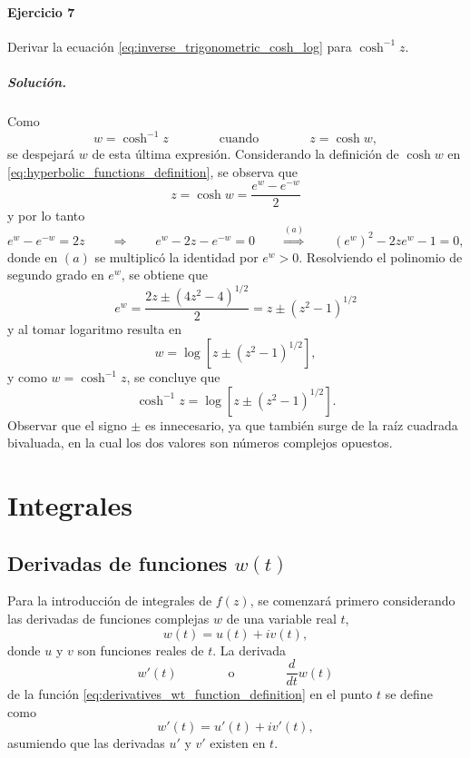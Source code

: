 \documentclass[a4paper]{report}
\begin{document}
\subsubsection{Ejercicio 7}

Derivar la ecuación \ref{eq:inverse_trigonometric_cosh_log} para \(\cosh^{-1}z\).

\paragraph{Solución.} Como
\[
 w=\cosh^{-1}z
 \qquad\qquad\textrm{cuando}\qquad\qquad
 z=\cosh w,
\]
se despejará \(w\) de esta última expresión. Considerando la definición de \(\cosh w\) en  \ref{eq:hyperbolic_functions_definition}, se observa que 
\[
 z=\cosh w=\dfrac{e^w-e^{-w}}{2}
\]
y por lo tanto
\[
 e^w-e^{-w}=2z
 \qquad\Rightarrow\qquad 
 e^w-2z-e^{-w}=0
 \qquad\overset{(a)}{\Rightarrow}\qquad 
 (e^w)^2-2ze^w-1=0,
\]
donde en \((a)\) se multiplicó la identidad por \(e^w>0\). Resolviendo el polinomio de segundo grado en \(e^w\), se obtiene que 
\[
 e^w=\frac{2z\pm(4z^2-4)^{1/2}}{2}=z\pm(z^2-1)^{1/2}
\]
y al tomar logaritmo resulta en 
\[
 w=\log\left[z\pm(z^2-1)^{1/2}\right],
\]
y como \(w=\cosh^{-1}z\), se concluye que 
\[
 \cosh^{-1}z=\log\left[z\pm(z^2-1)^{1/2}\right].
\]
Observar que el signo \(\pm\) es innecesario, ya que también surge de la raíz cuadrada bivaluada, en la cual los dos valores son números complejos opuestos. 

\chapter{Integrales}

\section{Derivadas de funciones \texorpdfstring{\(w(t)\)}{w(t)}}\label{sec:integrals_derivatives_of_wt}

Para la introducción de integrales de \(f(z)\), se comenzará primero considerando las derivadas de funciones complejas \(w\) de una variable real \(t\),
\begin{equation}\label{eq:derivatives_wt_function_definition}
 w(t)=u(t)+iv(t), 
\end{equation}
donde \(u\) y \(v\) son funciones reales de \(t\). La derivada
\[
 w'(t)
 \qquad\qquad\textrm{o}\qquad\qquad
 \frac{d}{dt}w(t)
\]
de la función \ref{eq:derivatives_wt_function_definition} en el punto \(t\) se define como
\begin{equation}\label{eq:derivatives_wt_derivative_definition}
 w'(t)=u'(t)+iv'(t), 
\end{equation}
asumiendo que las derivadas \(u'\) y \(v'\) existen en \(t\).
\end{document}

